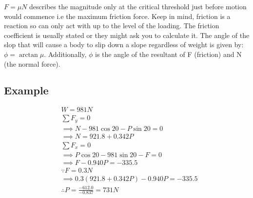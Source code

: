 \documentclass[a4paper, 12pt]{article}
\begin{document}
$F = \mu N$ describes the magnitude only at the critical threshold just before motion 
would commence i.e the maximum friction force. Keep in mind, friction is a reaction so can only act with up to the level of the loading. 
The friction coefficient is usually stated or they might ask you to calculate it. The angle of the slop that will cause a body to slip down
a slope regardless of weight is given by: $\phi = \arctan{\mu}$. Additionally, $\phi$ is the angle of the resultant of F (friction) and N (the normal force). 

\begin{example*}
\subsection{Example}
\begin{align*}
    &W = 981N \\
    &\sum F_y = 0 \\
    &\implies N - 981\cos{20} - P\sin{20} = 0 \\
    &\implies N = 921.8 + 0.342P \\
    &\sum F_x = 0 \\
    &\implies P\cos{20} - 981\sin{20} - F = 0 \\
    &\implies F - 0.940P = -335.5 \\
    &\because F = 0.3N \\
    &\implies 0.3(921.8 + 0.342P) - 0.940P = -335.5 \\
    &\therefore P = \frac{-612.0}{-0.837} = 731N \\
\end{align*}
\end{example*}
\end{document}
